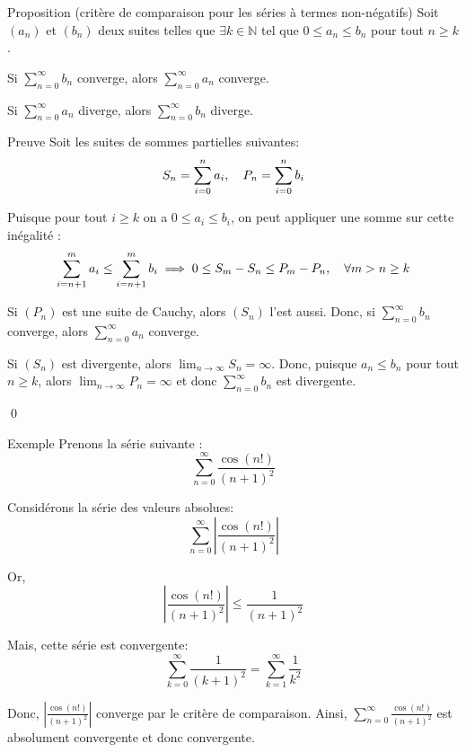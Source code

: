 \documentclass[a4paper]{article}
\begin{document}
\begin{parag}{Proposition (critère de comparaison pour les séries à termes non-négatifs)}
    Soit $\left(a_n\right)$ et $\left(b_n\right)$ deux suites telles que $\exists k \in \mathbb{N}$ tel que $0 \leq a_n \leq b_n$ pour tout $n \geq k$.

    Si $\sum_{n=0}^{\infty} b_n$ converge, alors $\sum_{n=0}^{\infty} a_n$ converge.

    Si $\sum_{n=0}^{\infty} a_n$ diverge, alors $\sum_{n=0}^{\infty} b_n$ diverge.

    \begin{subparag}{Preuve}
        Soit les suites de sommes partielles suivantes:
        \[S_n = \sum_{i=0}^{n} a_i, \quad P_n = \sum_{i=0}^{n} b_i\]

        Puisque pour tout $i \geq k$ on a $0 \leq a_i \leq b_i$, on peut appliquer une somme sur cette inégalité :
        \[\sum_{i=n+1}^{m} a_i \leq \sum_{i=n+1}^{m} b_i \implies 0 \leq S_m - S_n \leq P_m - P_n, \quad \forall m > n \geq k\]

        Si $\left(P_n\right)$ est une suite de Cauchy, alors $\left(S_n\right)$ l'est aussi. Donc, si $\sum_{n=0}^{\infty} b_n$ converge, alors $\sum_{n=0}^{\infty} a_n$ converge.


        Si $\left(S_n\right)$ est divergente, alors $\lim_{n \to \infty} S_n = \infty$. Donc, puisque $a_n \leq b_n$ pour tout $n \geq k$, alors $\lim_{n \to \infty} P_n = \infty$ et donc $\sum_{n=0}^{\infty} b_n$ est divergente.

        \qed
    \end{subparag}
\end{parag}


\begin{parag}{Exemple}
    Prenons la série suivante :
    \[\sum_{n=0}^{\infty} \frac{\cos\left(n!\right)}{\left(n+1\right)^2}\]

    Considérons la série des valeurs absolues:
    \[\sum_{n=0}^{\infty} \left|\frac{\cos\left(n!\right)}{\left(n+1\right)^2}\right|\]

    Or,
    \[\left|\frac{\cos\left(n!\right)}{\left(n+1\right)^2}\right| \leq \frac{1}{\left(n+1\right)^2}\]

    Mais, cette série est convergente:
    \[\sum_{k=0}^{\infty} \frac{1}{\left(k+1\right)^2} = \sum_{k=1}^{\infty} \frac{1}{k^2}\]

    Donc, $\left|\frac{\cos\left(n!\right)}{\left(n+1\right)^2}\right|$ converge par le critère de comparaison. Ainsi, $\sum_{n=0}^{\infty} \frac{\cos\left(n!\right)}{\left(n+1\right)^2}$ est absolument convergente et donc convergente.

\end{parag}
\end{document}
